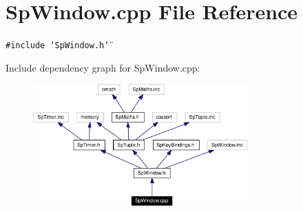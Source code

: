 \section{Sp\-Window.cpp File Reference}
\label{SpWindow_8cpp}
{\tt \#include \char`\"{}Sp\-Window.h\char`\"{}}\par


Include dependency graph for Sp\-Window.cpp:\begin{figure}[H]
\begin{center}
\leavevmode
\includegraphics[width=234pt]{SpWindow_8cpp__incl}
\end{center}
\end{figure}
